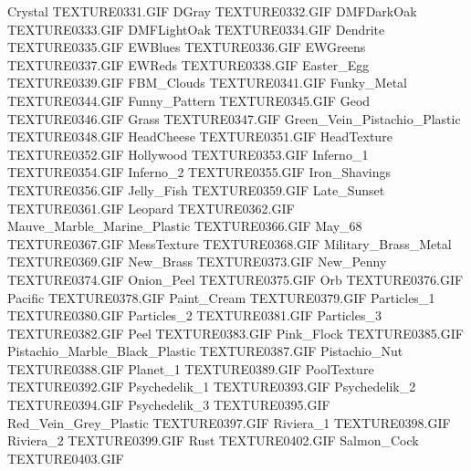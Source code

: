 Crystal                        TEXTURE\TEX0331.GIF
DGray                          TEXTURE\TEX0332.GIF
DMFDarkOak                     TEXTURE\TEX0333.GIF
DMFLightOak                    TEXTURE\TEX0334.GIF
Dendrite                       TEXTURE\TEX0335.GIF
EWBlues                        TEXTURE\TEX0336.GIF
EWGreens                       TEXTURE\TEX0337.GIF
EWReds                         TEXTURE\TEX0338.GIF
Easter_Egg                     TEXTURE\TEX0339.GIF
FBM_Clouds                     TEXTURE\TEX0341.GIF
Funky_Metal                    TEXTURE\TEX0344.GIF
Funny_Pattern                  TEXTURE\TEX0345.GIF
Geod                           TEXTURE\TEX0346.GIF
Grass                          TEXTURE\TEX0347.GIF
Green_Vein_Pistachio_Plastic   TEXTURE\TEX0348.GIF
HeadCheese                     TEXTURE\TEX0351.GIF
HeadTexture                    TEXTURE\TEX0352.GIF
Hollywood                      TEXTURE\TEX0353.GIF
Inferno_1                      TEXTURE\TEX0354.GIF
Inferno_2                      TEXTURE\TEX0355.GIF
Iron_Shavings                  TEXTURE\TEX0356.GIF
Jelly_Fish                     TEXTURE\TEX0359.GIF
Late_Sunset                    TEXTURE\TEX0361.GIF
Leopard                        TEXTURE\TEX0362.GIF
Mauve_Marble_Marine_Plastic    TEXTURE\TEX0366.GIF
May_68                         TEXTURE\TEX0367.GIF
MessTexture                    TEXTURE\TEX0368.GIF
Military_Brass_Metal           TEXTURE\TEX0369.GIF
New_Brass                      TEXTURE\TEX0373.GIF
New_Penny                      TEXTURE\TEX0374.GIF
Onion_Peel                     TEXTURE\TEX0375.GIF
Orb                            TEXTURE\TEX0376.GIF
Pacific                        TEXTURE\TEX0378.GIF
Paint_Cream                    TEXTURE\TEX0379.GIF
Particles_1                    TEXTURE\TEX0380.GIF
Particles_2                    TEXTURE\TEX0381.GIF
Particles_3                    TEXTURE\TEX0382.GIF
Peel                           TEXTURE\TEX0383.GIF
Pink_Flock                     TEXTURE\TEX0385.GIF
Pistachio_Marble_Black_Plastic TEXTURE\TEX0387.GIF
Pistachio_Nut                  TEXTURE\TEX0388.GIF
Planet_1                       TEXTURE\TEX0389.GIF
PoolTexture                    TEXTURE\TEX0392.GIF
Psychedelik_1                  TEXTURE\TEX0393.GIF
Psychedelik_2                  TEXTURE\TEX0394.GIF
Psychedelik_3                  TEXTURE\TEX0395.GIF
Red_Vein_Grey_Plastic          TEXTURE\TEX0397.GIF
Riviera_1                      TEXTURE\TEX0398.GIF
Riviera_2                      TEXTURE\TEX0399.GIF
Rust                           TEXTURE\TEX0402.GIF
Salmon_Cock                    TEXTURE\TEX0403.GIF
